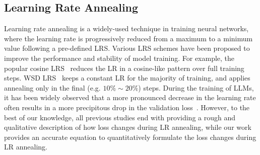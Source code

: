 \subsection{Learning Rate Annealing}
Learning rate annealing is a widely-used technique in training neural networks, where the learning rate is progressively reduced from a maximum to a minimum value following a pre-defined LRS. Various LRS schemes have been proposed to improve the performance and stability of model training. For example, the popular cosine LRS~\citep{loshchilov2016sgdr} reduces the LR in a cosine-like pattern over full training steps. WSD LRS~\citep{hu2024minicpm} keeps a constant LR for the majority of training, and applies annealing only in the final (e.g. $10\%\sim 20\%$) steps. During the training of LLMs, it has been widely observed
that a more pronounced decrease in the learning rate often results in a more precipitous drop in the
validation loss~\citep{loshchilov2016sgdr,simple-scalable-cpt2024,deepseek-ai2024deepseek,hu2024minicpm}. However, to the best of our knowledge, all previous studies end with providing a rough and
qualitative description of how loss changes during LR annealing, while our work provides an accurate equation to
quantitatively formulate the loss changes during LR annealing.


